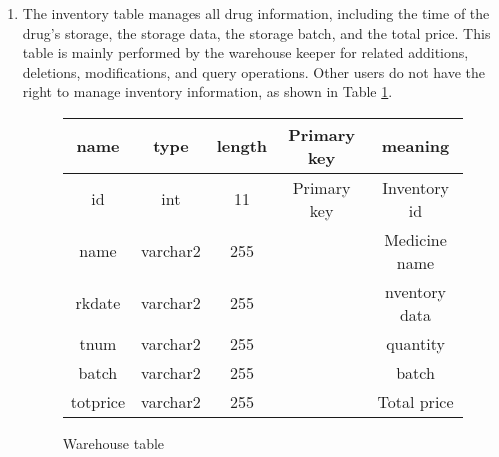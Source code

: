 \begin{enumerate}
\item 
The inventory table manages all drug information, including the time of the drug's storage, the storage data, the storage batch, and the total price. This table is mainly performed by the warehouse keeper for related additions, deletions, modifications, and query operations. Other users do not have the right to manage inventory information, as shown in Table \ref{fig:t2}.
\begin{figure}[!h]
\centering
\begin{tabular}{|c|c|c|c|c|}
\hline
name & type & length & Primary key & meaning \\
\hline
id & int & 11 & Primary key & Inventory id\\
\hline
name & varchar2 & 255 & & 	    Medicine name\\
\hline
rkdate & varchar2 & 255	 &  & nventory data\\
\hline
tnum & varchar2 & 255 &  & quantity\\
\hline
batch & varchar2 & 255 &  & batch\\
\hline
totprice & varchar2 & 255 &  & Total price\\
\hline
\end{tabular}   
\caption{Warehouse table}
    \label{fig:t2}
\end{figure}


\end{enumerate}

